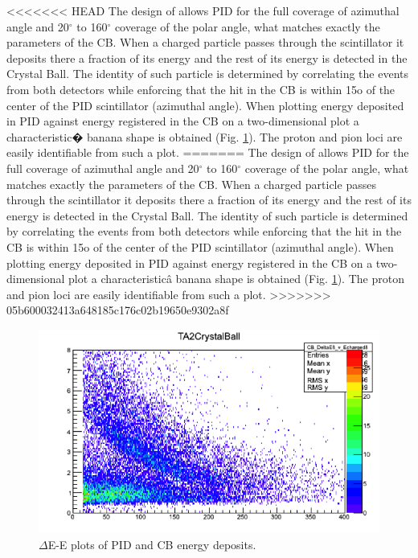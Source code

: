 <<<<<<< HEAD
\indent The design of allows PID for the full coverage of azimuthal angle and 20$^{\circ}$ to 160$^{\circ}$ coverage of the polar angle, what matches exactly the parameters of the CB. When  a  charged  particle  passes  through  the  scintillator  it  deposits  there  a fraction of its energy and the rest of its energy is detected in the Crystal Ball. The identity  of  such  particle  is  determined  by  correlating  the  events  from  both detectors while enforcing that the hit in the CB is within 15o of the center of the PID scintillator (azimuthal angle). When plotting energy deposited in PID against energy registered in the CB on a two-dimensional plot a characteristic� banana shape is obtained (Fig. \ref{banana}). The proton and pion loci are easily identifiable from such a plot.
=======
\indent The design of allows PID for the full coverage of azimuthal angle and 20$^{\circ}$ to 160$^{\circ}$ coverage of the polar angle, what matches exactly the parameters of the CB. When  a  charged  particle  passes  through  the  scintillator  it  deposits  there  a fraction of its energy and the rest of its energy is detected in the Crystal Ball. The identity  of  such  particle  is  determined  by  correlating  the  events  from  both detectors while enforcing that the hit in the CB is within 15o of the center of the PID scintillator (azimuthal angle). When plotting energy deposited in PID against energy registered in the CB on a two-dimensional plot a characteristicâ banana shape is obtained (Fig. \ref{banana}). The proton and pion loci are easily identifiable from such a plot.
>>>>>>> 05b600032413a648185c176c02b19650e9302a8f

\begin{figure}[H]
\begin{center}
\includegraphics[scale=0.8]{banana.png}
\caption{$\Delta$E-E plots of PID and CB energy deposits.}
\label{banana}
\end{center}
\end{figure}

